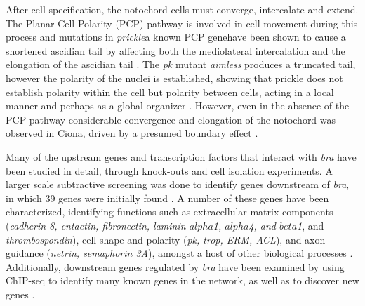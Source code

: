 After cell specification, the notochord cells must converge, intercalate and extend. The Planar Cell Polarity (PCP) pathway is involved in cell movement during this process and mutations in \textit{prickle}\textemdash a known PCP gene\textemdash have been shown to cause a shortened ascidian tail by affecting both the mediolateral intercalation and the elongation of the ascidian tail \cite{jiang_ascidian_2005}. The \textit{pk} mutant \textit{aimless} produces a truncated tail, however the polarity of the nuclei is established, showing that prickle does not establish polarity within the cell but polarity between cells, acting in a local manner and perhaps as a global organizer \cite{jiang_ascidian_2005,kourakis_one-dimensional_2014}. However, even in the absence of the PCP pathway considerable convergence and elongation of the notochord was observed in Ciona, driven by a presumed boundary effect \cite{veeman_chongmague_2008}.

Many of the upstream genes and transcription factors that interact with \textit{bra} have been studied in detail, through knock-outs and cell isolation experiments. A larger scale subtractive screening was done to identify genes downstream of \textit{bra}, in which 39 genes were initially found \cite{hotta_temporal_1999}. A number of these genes have been characterized, identifying functions such as extracellular matrix components (\textit{cadherin 8, entactin, fibronectin, laminin $alpha$1, $alpha$4, and $beta$1}, and {\em thrombospondin}), cell shape and polarity (\textit{pk, trop, ERM, ACL}), and axon guidance (\textit{netrin, semaphorin 3A}), amongst a host of other biological processes \cite{hotta_characterization_2000,hotta_brachyury-downstream_2007,kugler_evolutionary_2008}. Additionally, downstream genes regulated by \textit{bra} have been examined by using ChIP-seq to identify many known genes in the network, as well as to discover new genes \cite{kubo_genomic_2010,katikala_functional_2013}.

